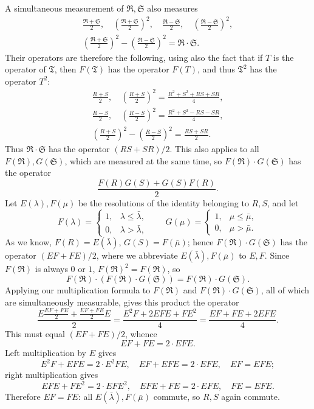 \documentclass[fontsize=13pt,twoside,openany,headings=normal,parskip=false,bookmarkpackage=false,DIV=calc]{scrbook}
\begin{document}
\hypertarget{origpage-119}{}%
A simultaneous measurement of $\mathfrak R,\mathfrak S$ also measures
\begin{gather*}
\frac{\mathfrak R+\mathfrak S}2,\quad
\left(\frac{\mathfrak R+\mathfrak S}2\right)^2,\quad
\frac{\mathfrak R-\mathfrak S}2,\quad
\left(\frac{\mathfrak R-\mathfrak S}2\right)^2,\\
\left(\frac{\mathfrak R+\mathfrak S}2\right)^2-
\left(\frac{\mathfrak R-\mathfrak S}2\right)^2=\mathfrak R\cdot\mathfrak S.
\end{gather*}
Their operators are therefore the following, using also the fact that if $T$ is the operator of $\mathfrak T$, then $F(\mathfrak T)$ has the operator $F(T)$, and thus $\mathfrak T^2$ has the operator $T^2$:
\begin{gather*}
\frac{R+S}2,\quad
\left(\frac{R+S}2\right)^2=\frac{R^2+S^2+RS+SR}4,\\
\frac{R-S}2,\quad
\left(\frac{R-S}2\right)^2=\frac{R^2+S^2-RS-SR}4,\\
\left(\frac{R+S}2\right)^2-\left(\frac{R-S}2\right)^2=\frac{RS+SR}2.
\end{gather*}
Thus $\mathfrak R\cdot\mathfrak S$ has the operator $(RS+SR)/2$. This also applies to all $F(\mathfrak R),G(\mathfrak S)$, which are measured at the same time, so $F(\mathfrak R)\cdot G(\mathfrak S)$ has the operator
\[
\frac{F(R)G(S)+G(S)F(R)}2.
\]
Let $E(\lambda),F(\mu)$ be the resolutions of the identity belonging to $R,S$, and let
\[
F(\lambda)=\begin{cases}1,&\lambda\le\bar\lambda,\\0,&\lambda>\bar\lambda,\end{cases}
\qquad
G(\mu)=\begin{cases}1,&\mu\le\bar\mu,\\0,&\mu>\bar\mu.\end{cases}
\]
As we know, $F(R)=E(\bar\lambda)$, $G(S)=F(\bar\mu)$; hence $F(\mathfrak R)\cdot G(\mathfrak S)$ has the operator $(EF+FE)/2$, where we abbreviate $E(\bar\lambda),F(\bar\mu)$ to $E,F$. Since $F(\mathfrak R)$ is always $0$ or $1$, $F(\mathfrak R)^2=F(\mathfrak R)$, so
\[
F(\mathfrak R)\cdot(F(\mathfrak R)\cdot G(\mathfrak S))=F(\mathfrak R)\cdot G(\mathfrak S).
\]
Applying our multiplication formula to $F(\mathfrak R)$ and $F(\mathfrak R)\cdot G(\mathfrak S)$, all of which are simultaneously measurable, gives this product the operator
\[
\frac{E\frac{EF+FE}2+\frac{EF+FE}2E}2
=\frac{E^2F+2EFE+FE^2}4
=\frac{EF+FE+2EFE}4.
\]
This must equal $(EF+FE)/2$, whence
\[
EF+FE=2\cdot EFE.
\]
Left multiplication by $E$ gives
\[
E^2F+EFE=2\cdot E^2FE,\quad EF+EFE=2\cdot EFE,\quad EF=EFE;
\]
right multiplication gives
\[
EFE+FE^2=2\cdot EFE^2,\quad EFE+FE=2\cdot EFE,\quad FE=EFE.
\]
Therefore $EF=FE$: all $E(\bar\lambda),F(\bar\mu)$ commute, so $R,S$ again commute.
\end{document}
